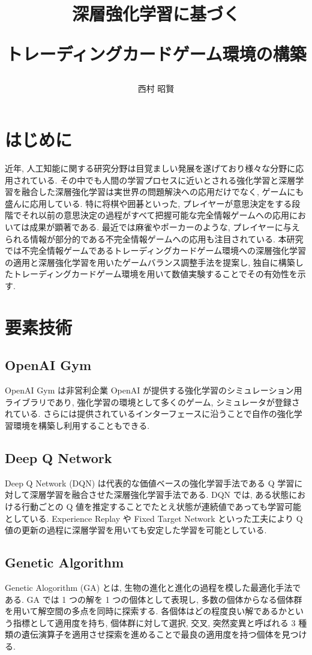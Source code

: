 \documentclass[a4paper,twoside,twocolumn,10pt]{article}
\title{深層強化学習に基づく
\par
トレーディングカードゲーム環境の構築}
\author{西村 昭賢}
\begin{document}
\maketitle %
\small

\section{はじめに}
近年, 人工知能に関する研究分野は目覚ましい発展を遂げており様々な分野に応用されている. その中でも人間の学習プロセスに近いとされる強化学習と深層学習を融合した深層強化学習は実世界の問題解決への応用だけでなく, ゲームにも盛んに応用している.
特に将棋や囲碁といった, プレイヤーが意思決定をする段階でそれ以前の意思決定の過程がすべて把握可能な完全情報ゲームへの応用においては成果が顕著である. 
最近では麻雀やポーカーのような, プレイヤーに与えられる情報が部分的である不完全情報ゲームへの応用も注目されている.
本研究では不完全情報ゲームであるトレーディングカードゲーム環境への深層強化学習の適用と深層強化学習を用いたゲームバランス調整手法を提案し, 独自に構築したトレーディングカードゲーム環境を用いて数値実験することでその有効性を示す. 

\section{要素技術}
\subsection{OpenAI Gym}
OpenAI Gym \cite{OpenAIGym} は非営利企業 OpenAI が提供する強化学習のシミュレーション用ライブラリであり, 強化学習の環境として多くのゲーム, シミュレータが登録されている. さらには提供されているインターフェースに沿うことで自作の強化学習環境を構築し利用することもできる.
\subsection{Deep Q Network}
Deep Q Network (DQN) \cite{DQN} は代表的な価値ベースの強化学習手法である Q 学習に対して深層学習を融合させた深層強化学習手法である.
 DQN では, ある状態における行動ごとの Q 値を推定することでたとえ状態が連続値であっても学習可能としている. Experience Replay や Fixed Target Network といった工夫により Q 値の更新の過程に深層学習を用いても安定した学習を可能としている.

\subsection{Genetic Algorithm}
Genetic Alogorithm (GA) とは, 生物の進化と進化の過程を模した最適化手法である. GA では 1 つの解を 1 つの個体として表現し, 多数の個体からなる個体群を用いて解空間の多点を同時に探索する. 各個体はどの程度良い解であるかという指標として適用度を持ち, 個体群に対して選択, 交叉, 突然変異と呼ばれる 3 種類の遺伝演算子を適用させ探索を進めることで最良の適用度を持つ個体を見つける.
\end{document}
